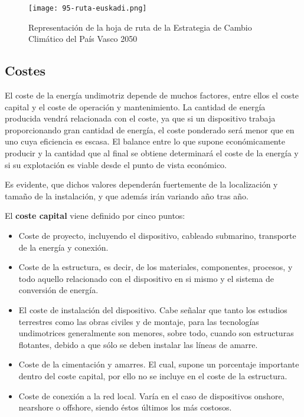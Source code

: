 \begin{figure}
\centering
\texttt{[image: 95-ruta-euskadi.png]}
\caption[Hoja de ruta del País Vasco]{Representación de la hoja de ruta de la Estrategia de Cambio Climático del País Vasco 2050}
\label{fig:rutaeus}
\end{figure}

\subsection{Costes}\label{header-n204}

El coste de la energía undimotriz depende de muchos factores, entre
ellos el coste capital y el coste de operación y mantenimiento. La
cantidad de energía producida vendrá relacionada con el coste, ya que si
un dispositivo trabaja proporcionando gran cantidad de energía, el coste
ponderado será menor que en uno cuya eficiencia es escasa. El balance
entre lo que supone económicamente producir y la cantidad que al final
se obtiene determinará el coste de la energía y si su explotación es
viable desde el punto de vista económico.

Es evidente, que dichos valores dependerán fuertemente de la
localización y tamaño de la instalación, y que además irán variando año
tras año.

El \textbf{coste capital} viene definido por cinco puntos:

\begin{itemize}
\item
  Coste de proyecto, incluyendo el dispositivo, cableado submarino,
  transporte de la energía y conexión.
\item
  Coste de la estructura, es decir, de los materiales, componentes,
  procesos, y todo aquello relacionado con el dispositivo en si mismo y
  el sistema de conversión de energía.
\item
  El coste de instalación del dispositivo. Cabe señalar que tanto los
  estudios terrestres como las obras civiles y de montaje, para las
  tecnologías undimotrices generalmente son menores, sobre todo, cuando
  son estructuras flotantes, debido a que sólo se deben instalar las
  líneas de amarre.
\item
  Coste de la cimentación y amarres. El cual, supone un porcentaje
  importante dentro del coste capital, por ello no se incluye en el
  coste de la estructura.
\item
  Coste de conexión a la red local. Varía en el caso de dispositivos
  onshore, nearshore o offshore, siendo éstos últimos los más costosos.
\end{itemize}

